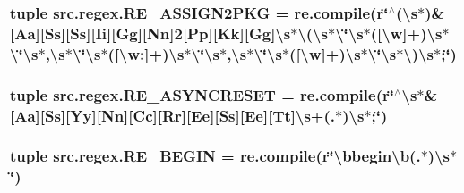 \hypertarget{namespacesrc_1_1regex_aae44d3d4c5d987de8d14273de4199e99}{
\subsubsection[{R\-E\-\_\-\-A\-S\-S\-I\-G\-N2\-P\-K\-G}]{\setlength{\rightskip}{0pt plus 5cm}tuple src.\-regex.\-R\-E\-\_\-\-A\-S\-S\-I\-G\-N2\-P\-K\-G = re.\-compile(r\char`\"{}$^\wedge$(\textbackslash{}s$\ast$)\&\mbox{[}Aa\mbox{]}\mbox{[}Ss\mbox{]}\mbox{[}Ss\mbox{]}\mbox{[}Ii\mbox{]}\mbox{[}Gg\mbox{]}\mbox{[}Nn\mbox{]}2\mbox{[}Pp\mbox{]}\mbox{[}Kk\mbox{]}\mbox{[}Gg\mbox{]}\textbackslash{}s$\ast$\textbackslash{}(\textbackslash{}s$\ast$\textbackslash{}\char`\"{}\textbackslash{}s$\ast$(\mbox{[}\textbackslash{}w\mbox{]}+)\textbackslash{}s$\ast$\textbackslash{}\char`\"{}\textbackslash{}s$\ast$,\textbackslash{}s$\ast$\textbackslash{}\char`\"{}\textbackslash{}s$\ast$(\mbox{[}\textbackslash{}w\-:\mbox{]}+)\textbackslash{}s$\ast$\textbackslash{}\char`\"{}\textbackslash{}s$\ast$,\textbackslash{}s$\ast$\textbackslash{}\char`\"{}\textbackslash{}s$\ast$(\mbox{[}\textbackslash{}w\mbox{]}+)\textbackslash{}s$\ast$\textbackslash{}\char`\"{}\textbackslash{}s$\ast$\textbackslash{})\textbackslash{}s$\ast$;\char`\"{})}}\label{namespacesrc_1_1regex_aae44d3d4c5d987de8d14273de4199e99}
\hypertarget{namespacesrc_1_1regex_aac34f33213c716491145cfe1cbabf467}{
\subsubsection[{R\-E\-\_\-\-A\-S\-Y\-N\-C\-R\-E\-S\-E\-T}]{\setlength{\rightskip}{0pt plus 5cm}tuple src.\-regex.\-R\-E\-\_\-\-A\-S\-Y\-N\-C\-R\-E\-S\-E\-T = re.\-compile(r\char`\"{}$^\wedge$\textbackslash{}s$\ast$\&\mbox{[}Aa\mbox{]}\mbox{[}Ss\mbox{]}\mbox{[}Yy\mbox{]}\mbox{[}Nn\mbox{]}\mbox{[}Cc\mbox{]}\mbox{[}Rr\mbox{]}\mbox{[}Ee\mbox{]}\mbox{[}Ss\mbox{]}\mbox{[}Ee\mbox{]}\mbox{[}Tt\mbox{]}\textbackslash{}s+(.$\ast$)\textbackslash{}s$\ast$;\char`\"{})}}\label{namespacesrc_1_1regex_aac34f33213c716491145cfe1cbabf467}
\hypertarget{namespacesrc_1_1regex_aef7f22585f350b07dde6de3411cde07d}{
\subsubsection[{R\-E\-\_\-\-B\-E\-G\-I\-N}]{\setlength{\rightskip}{0pt plus 5cm}tuple src.\-regex.\-R\-E\-\_\-\-B\-E\-G\-I\-N = re.\-compile(r\char`\"{}\textbackslash{}bbegin\textbackslash{}b(.$\ast$)\textbackslash{}s$\ast$\char`\"{})}}\label{namespacesrc_1_1regex_aef7f22585f350b07dde6de3411cde07d}
